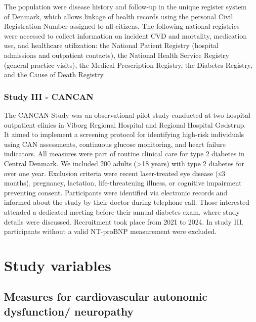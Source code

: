 \documentclass[
  a4paper,
  headsepline=true,
  open=any]{scrbook}
\begin{document}
The population were disease history and follow-up in the unique register
system of Denmark, which allows linkage of health records using the
personal Civil Registration Number assigned to all citizens. The
following national registries were accessed to collect information on
incident CVD and mortality, medication use, and healthcare utilization:
the National Patient Registry (hospital admissions and outpatient
contacts), the National Health Service Registry (general practice
visits), the Medical Prescription Registry, the Diabetes Registry, and
the Cause of Death Registry.

\hypertarget{study-iii---cancan}{%
\subsection{Study III - CANCAN}\label{study-iii---cancan}}

The CANCAN Study was an observational pilot study conducted at two
hospital outpatient clinics in Viborg Regional Hospital and Regional
Hospital Gødstrup. It aimed to implement a screening protocol for
identifying high-risk individuals using CAN assessments, continuous
glucose monitoring, and heart failure indicators. All measures were part
of routine clinical care for type 2 diabetes in Central Denmark. We
included 200 adults (\textgreater18 years) with type 2 diabetes for over
one year. Exclusion criteria were recent laser-treated eye disease (≤3
months), pregnancy, lactation, life-threatening illness, or cognitive
impairment preventing consent. Participants were identified via
electronic records and informed about the study by their doctor during
telephone call. Those interested attended a dedicated meeting before
their annual diabetes exam, where study details were discussed.
Recruitment took place from 2021 to 2024. In study III, participants
without a valid NT-proBNP measurement were excluded.


\hypertarget{study-variables}{%
\chapter{Study variables}\label{study-variables}}

\hypertarget{measures-for-cardiovascular-autonomic-dysfunction-neuropathy}{%
\section{Measures for cardiovascular autonomic dysfunction/
neuropathy}\label{measures-for-cardiovascular-autonomic-dysfunction-neuropathy}}
\end{document}
